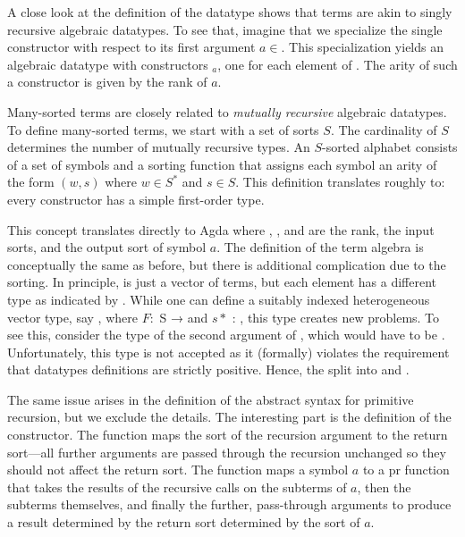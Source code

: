 \documentclass{jfp}
\begin{document}
A close look at the definition of the datatype  shows that
terms are akin to singly recursive algebraic datatypes. To see that,
imagine that we specialize the single constructor {\Acon} with respect
to its first argument $a\in{}$. This specialization yields
an algebraic datatype with constructors \Acon$_a$, one for each
element of . The arity of such a constructor is given by
the rank of $a$.

Many-sorted terms are closely related to \emph{mutually recursive} algebraic
datatypes. To define many-sorted terms, we start with a set of sorts
$S$. The cardinality of $S$ determines the number of mutually
recursive types. 
An $S$-sorted alphabet consists of a set of symbols and a sorting
function that assigns each symbol an arity of the form $(w, s)$ where
$w \in S^*$ and $s \in S$. This definition translates roughly to:
every constructor has a simple first-order type.

This concept translates directly to Agda where , , and  are the rank, the input sorts, and the output sort of symbol $a$.
\PRHTreesSorted
The definition of the term algebra is conceptually the same as before, but there is additional complication due to the sorting.
\PRHTreesTerm
In principle,  is just a vector of terms, but each element has a different type as indicated by .
While one can define a suitably indexed heterogeneous vector type, say , where $F :$ S → {\ASet} and $s*$ : , this type creates new problems.
To see this, consider the type of the second argument of {\Acon}, which would have to be .
Unfortunately, this type is not accepted as it (formally) violates the requirement that datatypes definitions are strictly positive. Hence, the split into  and .

The same issue arises in the definition of the abstract syntax for primitive recursion, but we exclude the details.
\PRHTreesDefinition
The interesting part is the definition of the {\AP} constructor.
The function  maps the sort of the recursion argument to the return sort---all further arguments are passed through the recursion unchanged so they should not affect the return sort.
The function  maps a symbol $a$ to a pr function that takes the results of the recursive calls on the subterms of $a$, then the subterms themselves, and finally the further, pass-through arguments to produce a result determined by the return sort determined by the sort of $a$.
\end{document}
